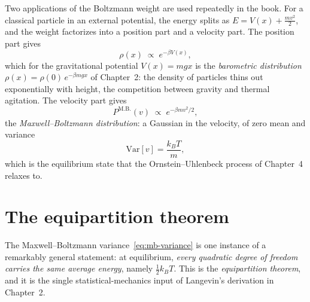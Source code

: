 \medskip

Two applications of the Boltzmann weight are used repeatedly in the book.
For a classical particle in an external potential, the energy splits as $E = V(x) + \tfrac{mv^2}{2}$, and the weight factorizes into a position part and a velocity part.
The position part gives
\begin{equation}\label{eq:barometric-app}
\rho(x) \;\propto\; e^{-\beta V(x)},
\end{equation}
which for the gravitational potential $V(x) = mgx$ is the \emph{barometric distribution} $\rho(x) = \rho(0)\,e^{-\beta mgx}$ of Chapter~2: the density of particles thins out exponentially with height, the competition between gravity and thermal agitation.
The velocity part gives
\begin{equation}\label{eq:maxwell-boltzmann}
P^{\mathrm{M.B.}}(v) \;\propto\; e^{-\beta m v^2/2},
\end{equation}
the \emph{Maxwell--Boltzmann distribution}: a Gaussian in the velocity, of zero mean and variance
\begin{equation}\label{eq:mb-variance}
\mathrm{Var}[v] = \frac{k_B T}{m},
\end{equation}
which is the equilibrium state that the Ornstein--Uhlenbeck process of Chapter~4 relaxes to.


\section{The equipartition theorem}
\label{app:equipartition}

The Maxwell--Boltzmann variance~\eqref{eq:mb-variance} is one instance of a remarkably general statement: at equilibrium, \emph{every quadratic degree of freedom carries the same average energy}, namely $\tfrac12 k_B T$.
This is the \emph{equipartition theorem}, and it is the single statistical-mechanics input of Langevin's derivation in Chapter~2.

